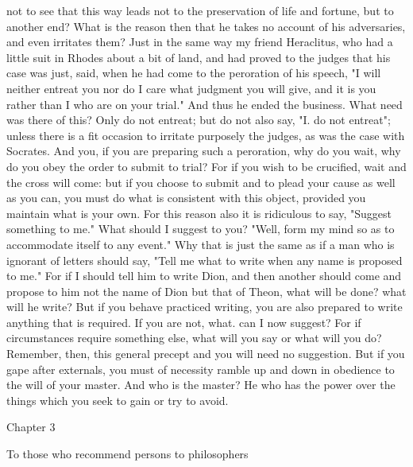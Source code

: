 \documentclass[a4paper]{article}
\begin{document}
not to see that this way leads not to the preservation of life and fortune, but
to another end? What is the reason then that he takes no account of his
adversaries, and even irritates them? Just in the same way my friend
Heraclitus, who had a little suit in Rhodes about a bit of land, and had proved
to the judges that his case was just, said, when he had come to the peroration
of his speech, "I will neither entreat you nor do I care what judgment you will
give, and it is you rather than I who are on your trial." And thus he ended the
business. What need was there of this? Only do not entreat; but do not also
say, "I. do not entreat"; unless there is a fit occasion to irritate purposely
the judges, as was the case with Socrates. And you, if you are preparing such a
peroration, why do you wait, why do you obey the order to submit to trial? For
if you wish to be crucified, wait and the cross will come: but if you choose to
submit and to plead your cause as well as you can, you must do what is
consistent with this object, provided you maintain what is your own.
    For this reason also it is ridiculous to say, "Suggest something to me."
What should I suggest to you? "Well, form my mind so as to accommodate itself
to any event." Why that is just the same as if a man who is ignorant of letters
should say, "Tell me what to write when any name is proposed to me." For if I
should tell him to write Dion, and then another should come and propose to him
not the name of Dion but that of Theon, what will be done? what will he write?
But if you behave practiced writing, you are also prepared to write anything
that is required. If you are not, what. can I now suggest? For if circumstances
require something else, what will you say or what will you do? Remember, then,
this general precept and you will need no suggestion. But if you gape after
externals, you must of necessity ramble up and down in obedience to the will of
your master. And who is the master? He who has the power over the things which
you seek to gain or try to avoid.

Chapter 3

To those who recommend persons to philosophers
\end{document}
